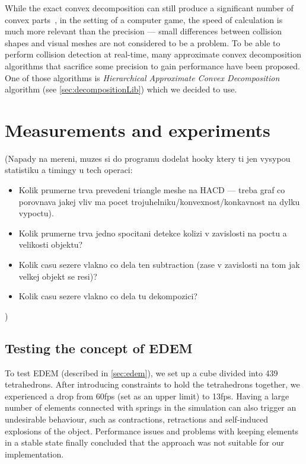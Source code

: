 While the exact convex decomposition can still produce a significant number of convex parts~\cite{convexDecomp}, in the setting of a computer game, the speed of calculation is much more relevant than the precision --- small differences between collision shapes and visual meshes are not considered to be a problem. To be able to perform collision detection at real-time, many approximate convex decomposition algorithms that sacrifice some precision to gain performance have been proposed. One of those algorithms is \emph{Hierarchical Approximate Convex Decomposition} algorithm (see \cref{sec:decompositionLib}) which we decided to use.

\section{Measurements and experiments}
\label{sec:testing}

(Napady na mereni, muzes si do programu dodelat hooky ktery ti jen vysypou statistiku a timingy u tech operaci:
\begin{itemize}
\item Kolik prumerne trva prevedeni triangle meshe na HACD --- treba graf co porovnava jakej vliv ma pocet trojuhelniku/konvexnost/konkavnost na dylku vypoctu).
\item Kolik prumerne trva jedno spocitani detekce kolizi v zavislosti na poctu a velikosti objektu?
\item Kolik casu sezere vlakno co dela ten subtraction (zase v zavislosti na tom jak velkej objekt se resi)?
\item Kolik casu sezere vlakno co dela tu dekompozici?
\end{itemize})
\subsection{Testing the concept of EDEM}
To test EDEM (described in \cref{sec:edem}), we set up a cube divided into 439 tetrahedrons. After introducing constraints to hold the tetrahedrons together, we experienced a drop from 60fps (set as an upper limit) to 13fps. Having a large number of elements connected with springs in the simulation can also trigger an undesirable behaviour, such as contractions, retractions and self-induced explosions of the object. Performance issues and problems with keeping elements in a stable state finally concluded that the approach was not suitable for our implementation.

